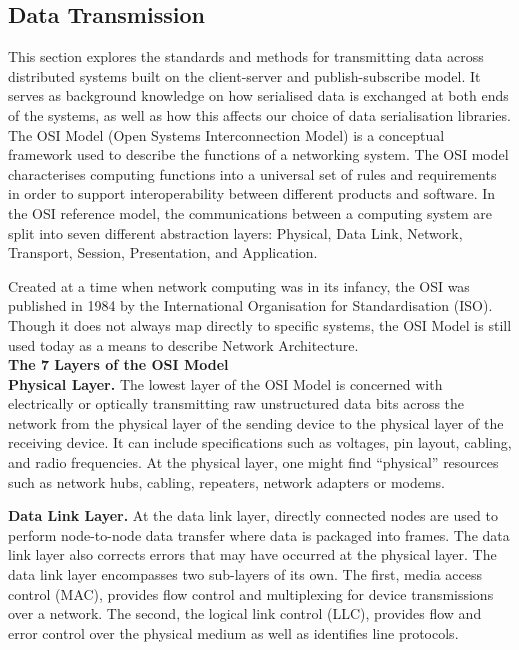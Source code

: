 \documentclass[../report.tex]{subfiles}
\begin{document}


\subsection{Data Transmission} %

This section explores the standards and methods for transmitting data across distributed systems built on the client-server and publish-subscribe model. It serves as background knowledge on how serialised data is exchanged at both ends of the systems, as well as how this affects our choice of data serialisation libraries. \\

The OSI Model (Open Systems Interconnection Model) is a conceptual framework used to describe the functions of a networking system. The OSI model characterises computing functions into a universal set of rules and requirements in order to support interoperability between different products and software. In the OSI reference model, the communications between a computing system are split into seven different abstraction layers: Physical, Data Link, Network, Transport, Session, Presentation, and Application.

Created at a time when network computing was in its infancy, the OSI was published in 1984 by the International Organisation for Standardisation (ISO). Though it does not always map directly to specific systems, the OSI Model is still used today as a means to describe Network Architecture. \\

\textbf{The 7 Layers of the OSI Model} \\

\textbf{Physical Layer.} The lowest layer of the OSI Model is concerned with electrically or optically transmitting raw unstructured data bits across the network from the physical layer of the sending device to the physical layer of the receiving device. It can include specifications such as voltages, pin layout, cabling, and radio frequencies. At the physical layer, one might find “physical” resources such as network hubs, cabling, repeaters, network adapters or modems.

\textbf{Data Link Layer.} At the data link layer, directly connected nodes are used to perform node-to-node data transfer where data is packaged into frames. The data link layer also corrects errors that may have occurred at the physical layer. The data link layer encompasses two sub-layers of its own. The first, media access control (MAC), provides flow control and multiplexing for device transmissions over a network. The second, the logical link control (LLC), provides flow and error control over the physical medium as well as identifies line protocols.
\end{document}
